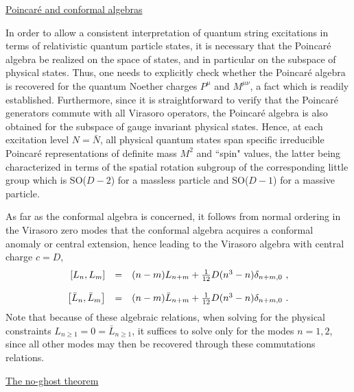 \documentclass[a4paper,11pt]{article}
\begin{document}
\vspace{10pt}

\noindent\underline{Poincar\'e and conformal algebras}

\vspace{10pt}

In order to allow a consistent interpretation of quantum string excitations
in terms of relativistic quantum particle states, it is necessary that 
the Poincar\'e algebra be realized on the space of states, and in particular
on the subspace of physical states. Thus, one needs to explicitly check
whether the Poincar\'e algebra is recovered for the quantum Noether charges
$P^\mu$ and $M^{\mu\nu}$, a fact which is readily established. Furthermore,
since it is straightforward to verify that the Poincar\'e generators commute
with all Virasoro operators, the Poincar\'e algebra is also obtained
for the subspace of gauge invariant physical states. Hence, at each
excitation level $N=\bar{N}$, all physical quantum states span specific
irreducible Poincar\'e representations of definite mass $M^2$ and ``spin"
values, the latter being characterized in terms of the spatial rotation
subgroup of the corresponding little group which is SO($D-2$) for a massless
particle and SO($D-1$) for a massive particle.

As far as the conformal algebra is concerned, it follows from normal
ordering in the Virasoro zero modes that the conformal algebra acquires
a conformal anomaly or central extension, hence leading to the Virasoro
algebra with central charge $c=D$,
\begin{equation}
\begin{array}{r c l}
\left[L_n,L_m\right]&=&(n-m)L_{n+m}+\frac{1}{12}D(n^3-n)\delta_{n+m,0}\ ,\\
 & & \\
\left[\bar{L}_n,\bar{L}_m\right]&=&(n-m)\bar{L}_{n+m}
+\frac{1}{12}D(n^3-n)\delta_{n+m,0}\ .
\end{array}
\end{equation}
Note that because of these algebraic relations, when solving for the
physical constraints $L_{n\ge 1}=0=\bar{L}_{n\ge 1}$, it suffices to
solve only for the modes $n=1,2$, since all other modes may then be recovered
through these commutations relations.

\vspace{10pt}

\noindent\underline{The no-ghost theorem}

\vspace{10pt}
\end{document}
